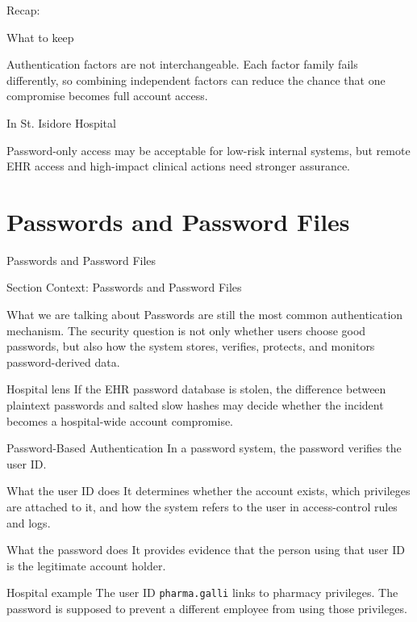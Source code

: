 \documentclass[presentation]{beamer}
\newcommand{\sectiontitleframe}[1]{
\begin{frame}[plain,c]
\begin{center}
{\usebeamerfont{title}\usebeamercolor[fg]{title}#1}
\end{center}
\end{frame}
}
\newcommand{\scenario}{St. Isidore Hospital}
\newcommand{\takeawaysframe}[2]{
  \begin{frame}[c]{Recap: \insertsection}
    \begin{block}{What to keep}
      #1
    \end{block}
    \begin{exampleblock}{In \scenario}
      #2
    \end{exampleblock}
  \end{frame}
}
\begin{document}
\takeawaysframe{
  Authentication factors are not interchangeable. Each factor family fails differently, so combining independent factors can reduce the chance that one compromise becomes full account access.
}{
  Password-only access may be acceptable for low-risk internal systems, but remote EHR access and high-impact clinical actions need stronger assurance.
}

\section{Passwords and Password Files}
\sectiontitleframe{Passwords and Password Files}

\begin{frame}[c]{Section Context: Passwords and Password Files}
\begin{block}{What we are talking about}
Passwords are still the most common authentication mechanism. The security question is not only
whether users choose good passwords, but also how the system stores, verifies, protects, and monitors
password-derived data.
\end{block}

\begin{exampleblock}{Hospital lens}
If the EHR password database is stolen, the difference between plaintext passwords and salted slow
hashes may decide whether the incident becomes a hospital-wide account compromise.
\end{exampleblock}
\end{frame}

\begin{frame}[c]{Password-Based Authentication}
  In a password system, the password verifies the user ID.

  \begin{block}{What the user ID does}
    It determines whether the account exists, which privileges are attached to it, and how the system refers to the user in access-control rules and logs.
  \end{block}

  \begin{block}{What the password does}
    It provides evidence that the person using that user ID is the legitimate account holder.
  \end{block}

  \begin{exampleblock}{Hospital example}
    The user ID \texttt{pharma.galli} links to pharmacy privileges. The password is supposed to prevent a different employee from using those privileges.
  \end{exampleblock}
\end{frame}
\end{document}
